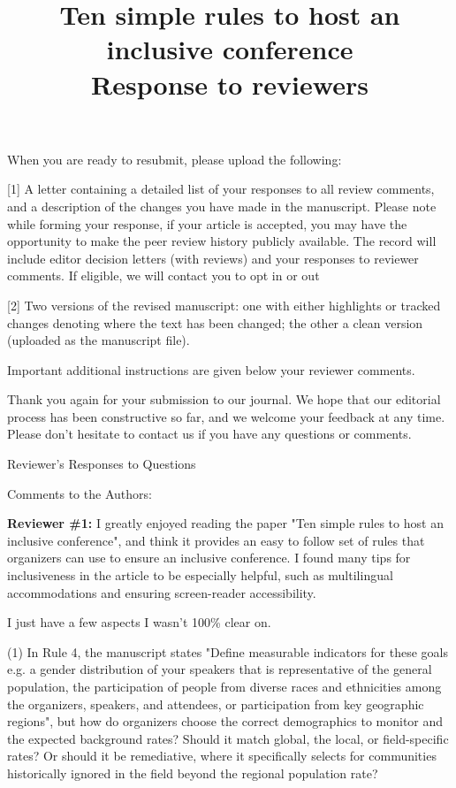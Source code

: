 \documentclass{article}
\title{Ten simple rules to host an inclusive conference\\ \vspace{0.5cm}
\textbf{Response to reviewers}}
\author{}
\date{}
\begin{document}
\maketitle

When you are ready to resubmit, please upload the following:


[1] A letter containing a detailed list of your responses to all review comments, and a description of the changes you have made in the manuscript. Please note while forming your response, if your article is accepted, you may have the opportunity to make the peer review history publicly available. The record will include editor decision letters (with reviews) and your responses to reviewer comments. If eligible, we will contact you to opt in or out

[2] Two versions of the revised manuscript: one with either highlights or tracked changes denoting where the text has been changed; the other a clean version (uploaded as the manuscript file).

Important additional instructions are given below your reviewer comments.

 Thank you again for your submission to our journal. We hope that our editorial process has been constructive so far, and we welcome your feedback at any time. Please don't hesitate to contact us if you have any questions or comments.



Reviewer's Responses to Questions

Comments to the Authors:

\textbf{Reviewer \#1:}
I greatly enjoyed reading the paper "Ten simple rules to host an inclusive conference", and think it provides an easy to follow set of rules that organizers can use to ensure an inclusive conference. I found many tips for inclusiveness in the article to be especially helpful, such as multilingual accommodations and ensuring screen-reader accessibility.

I just have a few aspects I wasn't 100\% clear on.

(1) In Rule 4, the manuscript states "Define measurable indicators for these goals e.g. a gender distribution of your speakers that is representative of the general population, the participation of people from diverse races and ethnicities among the organizers, speakers, and attendees, or participation from key geographic regions", but how do organizers choose the correct demographics to monitor and the expected background rates? Should it match global, the local, or field-specific rates? Or should it be remediative, where it specifically selects for communities historically ignored in the field beyond the regional population rate?
\end{document}
